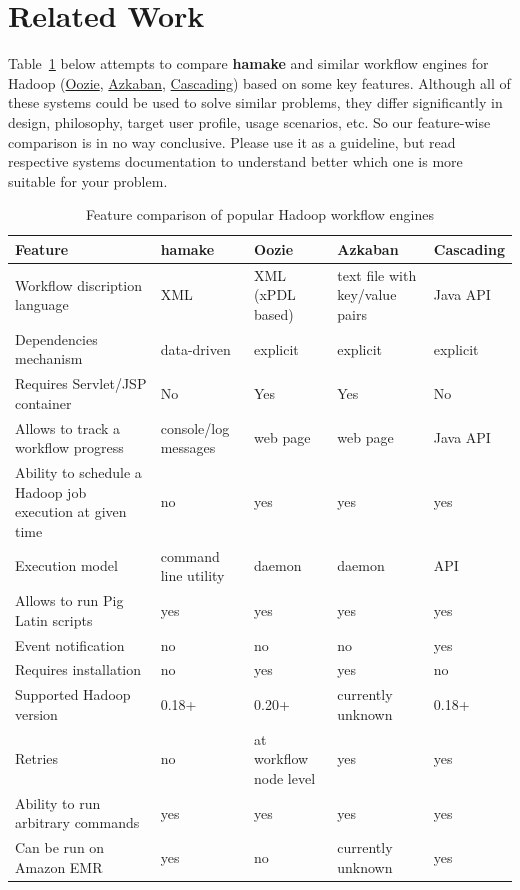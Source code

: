 \documentclass{article}
\begin{document}
\section{Related Work}

Table~\ref{table:1} below attempts to compare \textbf{hamake} and similar
workflow engines for Hadoop
(\href{http://github.com/tucu00/oozie1}{Oozie},
\href{http://sna-projects.com/azkaban/}{Azkaban},
\href{http://www.cascading.org/}{Cascading}) based on some key
features. Although all of these systems could be used to solve similar
problems, they differ significantly in design, philosophy, target user
profile, usage scenarios, etc.  So our feature-wise comparison is in
no way conclusive. Please use it as a guideline, but read respective
systems documentation to understand better which one is more suitable
for your problem.

\begin{table}
  \begin{tabular}{ | p{3cm} || l | l | l | l |}
    \hline
    \textbf{Feature} & \textbf{hamake} & \textbf{Oozie} & \textbf{Azkaban} & \textbf{Cascading} \\
    \hline
    Workflow discription language & XML & XML (xPDL based) & text file with key/value pairs & Java API \\
    Dependencies mechanism & data-driven & explicit & explicit & explicit \\
    Requires Servlet/JSP container & No & Yes & Yes & No \\
    Allows to track a workflow progress & console/log messages & web page & web page & Java API \\
    Ability to schedule a Hadoop job execution at given time & no & yes & yes & yes \\
    Execution model & command line utility & daemon & daemon & API \\
    Allows to run Pig Latin scripts & yes & yes & yes & yes \\
    Event notification & no & no & no & yes \\
    Requires installation & no & yes & yes & no \\
    Supported Hadoop version & 0.18+ & 0.20+ & currently unknown & 0.18+ \\
    Retries & no & at workflow node level & yes & yes \\
    Ability to run arbitrary commands & yes & yes & yes & yes \\
    Can be run on  Amazon EMR & yes & no & currently unknown & yes \\
    \hline
  \end{tabular}
  \caption{Feature comparison of popular Hadoop workflow engines }
  \label{table:1}
\end{table}
\end{document}
